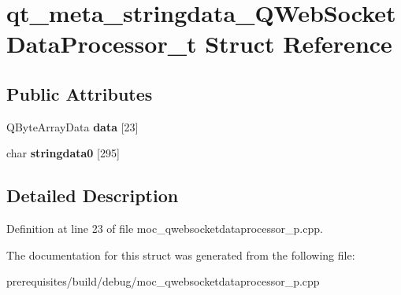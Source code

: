 \hypertarget{structqt__meta__stringdata___q_web_socket_data_processor__t}{}\section{qt\+\_\+meta\+\_\+stringdata\+\_\+\+Q\+Web\+Socket\+Data\+Processor\+\_\+t Struct Reference}
\label{structqt__meta__stringdata___q_web_socket_data_processor__t}
\subsection*{Public Attributes}
\begin{DoxyCompactItemize}
\item 
\mbox{\label{structqt__meta__stringdata___q_web_socket_data_processor__t_a96ff3388facafa4dbd8d2f76ead5b996}} 
Q\+Byte\+Array\+Data {\bfseries data} \mbox{[}23\mbox{]}
\item 
\mbox{\label{structqt__meta__stringdata___q_web_socket_data_processor__t_a39ffe0dcdb0f1967b60e88906680018a}} 
char {\bfseries stringdata0} \mbox{[}295\mbox{]}
\end{DoxyCompactItemize}


\subsection{Detailed Description}


Definition at line 23 of file moc\+\_\+qwebsocketdataprocessor\+\_\+p.\+cpp.



The documentation for this struct was generated from the following file\+:\begin{DoxyCompactItemize}
\item 
prerequisites/build/debug/moc\+\_\+qwebsocketdataprocessor\+\_\+p.\+cpp\end{DoxyCompactItemize}
